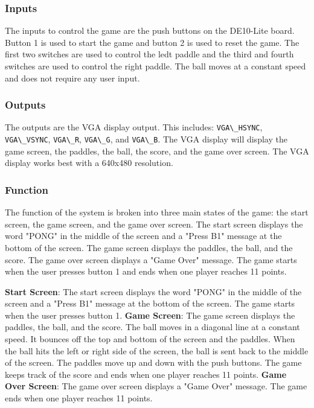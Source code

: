 \documentclass{article}
\newcommand{\code}[1]{\lstinline|#1|}
\begin{document}
\subsubsection*{Inputs}
The inputs to control the game are the push buttons on the DE10-Lite board. Button 1 is used to start the game and button 2 is used to reset the game. The first two switches are used to control the ledt paddle and the third and fourth switches are used to control the right paddle. The ball moves at a constant speed and does not require any user input.

\subsubsection*{Outputs}
The outputs are the VGA display output. This includes: \code{VGA\_HSYNC}, \code{VGA\_VSYNC}, \code{VGA\_R}, \code{VGA\_G}, and \code{VGA\_B}. The VGA display will display the game screen, the paddles, the ball, the score, and the game over screen. The VGA display works best with a 640x480 resolution.

\subsubsection*{Function}
The function of the system is broken into three main states of the game: the start screen, the game screen, and the game over screen. The start screen displays the word "PONG" in the middle of the screen and a "Press B1" message at the bottom of the screen. The game screen displays the paddles, the ball, and the score. The game over screen displays a "Game Over" message. The game starts when the user presses button 1 and ends when one player reaches 11 points.

\textbf{Start Screen}: The start screen displays the word "PONG" in the middle of the screen and a "Press B1" message at the bottom of the screen. The game starts when the user presses button 1.
\textbf{Game Screen}: The game screen displays the paddles, the ball, and the score. The ball moves in a diagonal line at a constant speed. It bounces off the top and bottom of the screen and the paddles. When the ball hits the left or right side of the screen, the ball is sent back to the middle of the screen. The paddles move up and down with the push buttons. The game keeps track of the score and ends when one player reaches 11 points.
\textbf{Game Over Screen}: The game over screen displays a "Game Over" message. The game ends when one player reaches 11 points.
\end{document}
